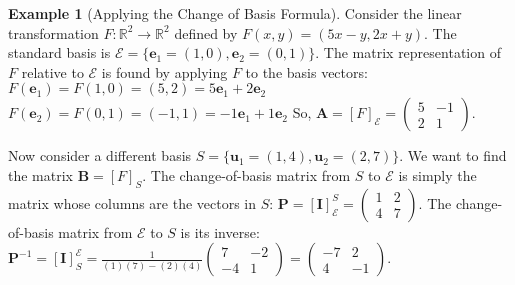 \documentclass[12pt, letterpaper]{article}
\theoremstyle{definition}
\newtheorem{example}{Example}[section]
\newcommand{\R}{\mathbb{R}}
\newcommand{\E}{\mathcal{E}}
\newcommand{\mat}[1]{\mathbf{#1}} %
\newcommand{\vect}[1]{\mathbf{#1}} %
\newcommand{\uvec}{\vect{u}} %
\newcommand{\e}{\vect{e}} %
\begin{document}
\begin{example}[Applying the Change of Basis Formula]
Consider the linear transformation $F: \R^2 \to \R^2$ defined by $F(x,y)=(5x-y, 2x+y)$.
The standard basis is $\E = \{\e_1=(1,0), \e_2=(0,1)\}$.
The matrix representation of $F$ relative to $\E$ is found by applying $F$ to the basis vectors:
$F(\e_1) = F(1,0) = (5, 2) = 5\e_1 + 2\e_2$
$F(\e_2) = F(0,1) = (-1, 1) = -1\e_1 + 1\e_2$
So, $\mat{A} = [F]_\E = \begin{pmatrix} 5 & -1 \\ 2 & 1 \end{pmatrix}$.

Now consider a different basis $S = \{\uvec_1=(1,4), \uvec_2=(2,7)\}$.
We want to find the matrix $\mat{B} = [F]_S$.
The change-of-basis matrix from $S$ to $\E$ is simply the matrix whose columns are the vectors in $S$:
$\mat{P} = [\mat{I}]_\E^S = \begin{pmatrix} 1 & 2 \\ 4 & 7 \end{pmatrix}$.
The change-of-basis matrix from $\E$ to $S$ is its inverse:
$\mat{P}^{-1} = [\mat{I}]_S^\E = \frac{1}{(1)(7)-(2)(4)} \begin{pmatrix} 7 & -2 \\ -4 & 1 \end{pmatrix} = \begin{pmatrix} -7 & 2 \\ 4 & -1 \end{pmatrix}$.


\end{example}
\end{document}
